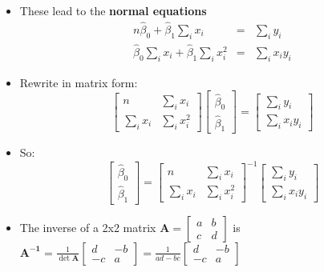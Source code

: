 \documentclass[11pt]{article}
\begin{document}
\begin{itemize}
\item These lead to the \textbf{normal equations}%
\begin{eqnarray*}
n\widehat{\beta }_{0}+\widehat{\beta }_{1}\sum\nolimits_{i}x_{i}
&=&\sum\nolimits_{i}y_{i} \\
\widehat{\beta }_{0}\sum\nolimits_{i}x_{i}+\widehat{\beta }%
_{1}\sum\nolimits_{i}x_{i}^{2} &=&\sum\nolimits_{i}x_{i}y_{i}
\end{eqnarray*}

\item Rewrite in matrix form:%
\begin{equation*}
\begin{bmatrix}
n & \sum\nolimits_{i}x_{i} \\ 
\sum\nolimits_{i}x_{i} & \sum\nolimits_{i}x_{i}^{2}%
\end{bmatrix}%
\begin{bmatrix}
\widehat{\beta }_{0} \\ 
\widehat{\beta }_{1}%
\end{bmatrix}%
=%
\begin{bmatrix}
\sum\nolimits_{i}y_{i} \\ 
\sum\nolimits_{i}x_{i}y_{i}%
\end{bmatrix}%
\end{equation*}

\item So:%
\begin{equation*}
\begin{bmatrix}
\widehat{\beta }_{0} \\ 
\widehat{\beta }_{1}%
\end{bmatrix}%
=%
\begin{bmatrix}
n & \sum\nolimits_{i}x_{i} \\ 
\sum\nolimits_{i}x_{i} & \sum\nolimits_{i}x_{i}^{2}%
\end{bmatrix}%
^{-1}%
\begin{bmatrix}
\sum\nolimits_{i}y_{i} \\ 
\sum\nolimits_{i}x_{i}y_{i}%
\end{bmatrix}%
\end{equation*}

\item The inverse of a 2x2 matrix $\mathbf{A=}%
\begin{bmatrix}
a & b \\ 
c & d%
\end{bmatrix}%
$ is $\mathbf{A}^{\mathbf{-1}}=\frac{1}{\det \mathbf{A}}%
\begin{bmatrix}
d & -b \\ 
-c & a%
\end{bmatrix}%
=\frac{1}{ad-bc}%
\begin{bmatrix}
d & -b \\ 
-c & a%
\end{bmatrix}%
$


\end{itemize}
\end{document}
